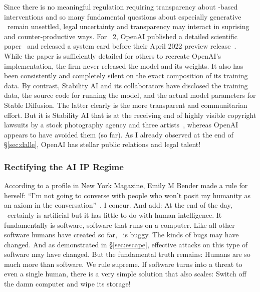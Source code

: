 Since there is no meaningful regulation requiring transparency about \AI-based
interventions and so many fundamental questions about especially generative \AI\
remain unsettled, legal uncertainty and transparency may interact in suprising
and counter-productive ways. For \DALLE~2, OpenAI published a detailed
scientific paper~\cite{RameshDhariwalea2022} and released a system card before
their April 2022 preview release~\cite{MishkinAhmad2022}. While the paper is
sufficiently detailed for others to recreate OpenAI's implementation, the firm
never released the model and its weights. It also has been consistently and
completely silent on the exact composition of its training data. By contrast,
Stability AI and its collaborators have disclosed the training data, the source
code for running the model, and the actual model parameters for Stable
Diffusion. The latter clearly is the more transparent and communitarian effort.
But it is Stability AI that is at the receiving end of highly visible copyright
lawsuits by a stock photography agency and three
artists~\cite{Butterick2023,Setty2023}, whereas OpenAI appears to have avoided
them (so far). As I already observed at the end of \S\ref{sec:dalle}, OpenAI has
stellar public relations and legal talent!


\subsubsection{Rectifying the AI IP Regime}

According to a profile in New York Magazine, Emily M Bender made a rule for
herself: ``I'm not going to converse with people who won't posit my humanity as
an axiom in the conversation''~\cite{Weil2023}. I concur. And add: At the end of
the day, \AI\ certainly is artificial but it has little to do with human
intelligence. It fundamentally is software, software that runs on a computer.
Like all other software humans have created so far, \AI\ is buggy. The kinds of
bugs may have changed. And as demonstrated in \S\ref{sec:escape}, effective
attacks on this type of software may have changed. But the fundamental truth
remains: Humans are so much more than software. We rule supreme. If software
turns into a threat to even a single human, there is a very simple solution that
also scales: Switch off the damn computer and wipe its storage!

